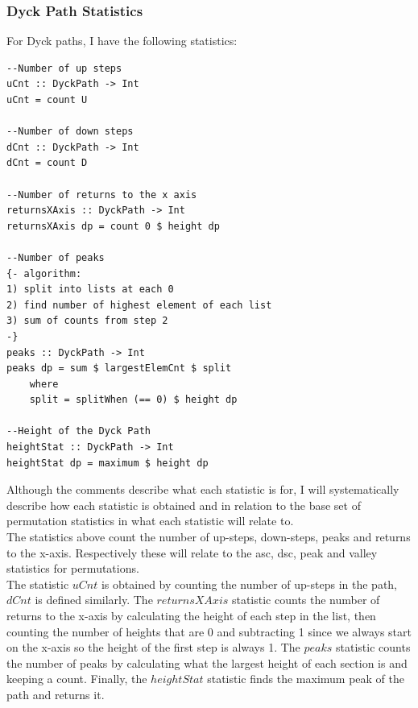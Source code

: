 \documentclass[12pt]{article}
\begin{document}
\subsubsection{Dyck Path Statistics}
For Dyck paths, I have the following statistics:
\begin{lstlisting}
--Number of up steps
uCnt :: DyckPath -> Int
uCnt = count U 

--Number of down steps
dCnt :: DyckPath -> Int
dCnt = count D 

--Number of returns to the x axis
returnsXAxis :: DyckPath -> Int
returnsXAxis dp = count 0 $ height dp

--Number of peaks
{- algorithm:
1) split into lists at each 0
2) find number of highest element of each list
3) sum of counts from step 2
-}
peaks :: DyckPath -> Int
peaks dp = sum $ largestElemCnt $ split
	where
	split = splitWhen (== 0) $ height dp

--Height of the Dyck Path
heightStat :: DyckPath -> Int 
heightStat dp = maximum $ height dp
\end{lstlisting}
Although the comments describe what each statistic is for, I will systematically describe how each statistic is obtained and in relation to the base set of permutation statistics in \cite{Clae01} what each statistic will relate to.\\
The statistics above count the number of up-steps, down-steps, peaks and returns to the x-axis. Respectively these will relate to the asc, dsc, peak and valley statistics for permutations.\\
The statistic $uCnt$ is obtained by counting the number of up-steps in the path, $dCnt$ is defined similarly. The $returnsXAxis$ statistic counts the number of returns to the x-axis by calculating the height of each step in the list, then counting the number of heights that are 0 and subtracting 1 since we always start on the x-axis so the height of the first step is always 1. The $peaks$ statistic counts the number of peaks by calculating what the largest height of each section is and keeping a count. Finally, the $heightStat$ statistic finds the maximum peak of the path and returns it.
\end{document}
